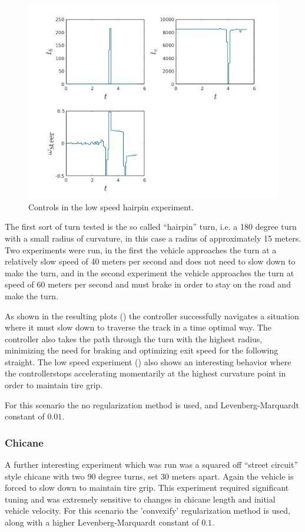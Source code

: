 \documentclass[conference,11pt]{IEEEtran}
\begin{document}
\begin{figure}[t]
  \centering
  \includegraphics[scale=0.5]{hairpin_lift_u.jpg}
  \caption{Controls in the low speed hairpin experiment.}
  \label{fig:hpu1}
\end{figure}

The first sort of turn tested is the so called ``hairpin'' turn, i.e. a 180 degree turn with a small radius of curvature, in this case a radius of approximately 15 meters. Two experiments were run,
in the first the vehicle approaches the turn at a relatively slow speed of 40 meters per second and does not need to slow down to make the turn, and in the second experiment the vehicle approaches
the turn at speed of 60 meters per second and must brake in order to stay on the road and make the turn.

As shown in the resulting plots () the controller successfully navigates a situation where it must slow down to traverse the track in a time optimal way.
The controller also takes the path through the turn with the highest radius, minimizing the need for braking and optimizing exit speed for the following straight. The low speed experiment
() also shows an interesting behavior where the controllerstops accelerating momentarily at the highest curvature point in order to maintain tire grip.

For this scenario the no regularization method is used, and Levenberg-Marquardt constant of $0.01$.

\subsubsection{Chicane}
A further interesting experiment which was run was a squared off ``street circuit'' style chicane with two 90 degree turns, set 30 meters apart. Again the vehicle is forced to slow down to
maintain tire grip. This experiment required significant tuning and was extremely sensitive to changes in chicane length and initial vehicle velocity. For this scenario the 'convexify' regularization
method is used, along with a higher Levenberg-Marquardt constant of $0.1$.
\end{document}
